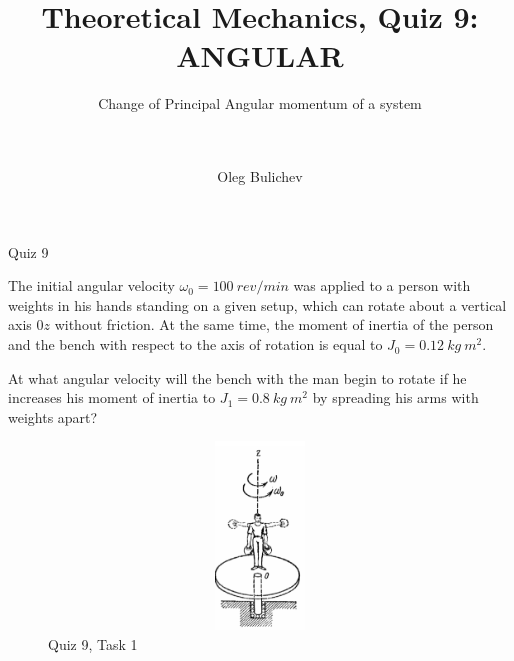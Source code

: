 \documentclass[aspectratio=169,xcolor=table,10pt, notes=hide]{beamer}
\title[Theoretical Mechanics]{Theoretical Mechanics, Quiz 9: ANGULAR} %
\subtitle{Change of Principal Angular momentum of a system \\ \  \\ \  } %
\author{Oleg Bulichev}
\newcommand{\fbckg}[1]{\usebackgroundtemplate{\texttt{[image: \#1]}}}%
\begin{document}
\setlength{\abovedisplayskip}{0pt}
\setlength{\belowdisplayskip}{0pt}
\setlength{\abovedisplayshortskip}{0pt}
\setlength{\belowdisplayshortskip}{0pt}

\fbckg{fibeamer/figs/title_page.png}

\note{}

\fbckg{fibeamer/figs/common.png}

\begin{frame}[t]{Quiz 9}
  \small
\begin{minipage}{0.6\textwidth}
  The initial angular velocity $\omega_0 = 100\ rev/min$ was applied to a person with weights in his hands standing on a given setup, which can rotate about a vertical axis $0z$ without friction. At the same time, the moment of inertia of the person and the bench with respect to the axis of rotation is equal to $J_0 = 0.12\ kg\ m^2$.
\bigskip

At what angular velocity will the bench with the man begin to rotate if he increases his moment of inertia to $J_1=0.8\ kg\ m^2$ by spreading his arms with weights apart?

\end{minipage}
\begin{minipage}{0.39\textwidth}
  \begin{figure}[H]
    \centering\includegraphics[height=5cm,width=1\textwidth,keepaspectratio]{quiz9_1}
    \caption*{Quiz 9, Task 1}
  \end{figure}
\end{minipage}
\end{frame}
\end{document}
